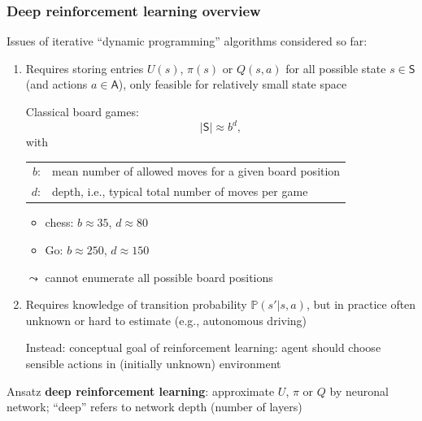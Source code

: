 \documentclass[t]{beamer}
\begin{document}
\begin{frame}
\frametitle{Deep reinforcement learning overview}
Issues of iterative ``dynamic programming'' algorithms considered so far:\\
\begin{enumerate}
\item Requires storing entries $U(s)$, $\pi(s)$ or $Q(s, a)$ for all possible state $s \in \mathsf{S}$ (and actions $a \in \mathsf{A}$), only feasible for relatively small state space

Classical board games:
\[
\lvert \mathsf{S} \rvert \approx b^d,
\]
with
\begin{center}
\begin{tabular}{rl}
$b$: & mean number of allowed moves for a given board position\\
$d$: & depth, i.e., typical total number of moves per game
\end{tabular}
\end{center}
\begin{itemize}
\item chess: $b \approx 35$, $d \approx 80$
\item Go: $b \approx 250$, $d \approx 150$
\end{itemize}
$\leadsto$ cannot enumerate all possible board positions

\item Requires knowledge of transition probability $\mathbb{P}(s' \vert s,a)$, but in practice often unknown or hard to estimate (e.g., autonomous driving)

Instead: conceptual goal of reinforcement learning: agent should choose sensible actions in (initially unknown) environment
\end{enumerate}

Ansatz \textbf{deep reinforcement learning}: approximate $U$, $\pi$ or $Q$ by neuronal network; ``deep'' refers to network depth (number of layers)
\end{frame}
\end{document}
